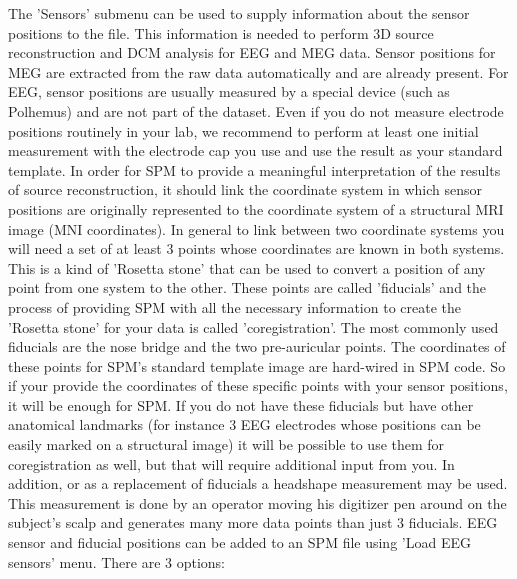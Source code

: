 The 'Sensors' submenu can be used to supply information about the
sensor positions to the file. This information is needed to perform 3D
source reconstruction and DCM analysis for EEG and MEG data. 
Sensor positions for MEG are extracted from the raw data automatically and are already present. For EEG,
sensor positions are usually measured by a special device (such as
Polhemus) and are not part of the dataset. Even if you do not
measure electrode positions routinely in your lab, we recommend to
perform at least one initial measurement with the electrode cap you
use and use the result as your standard template. In order for SPM to provide a meaningful
interpretation of the results of source reconstruction, it should link the coordinate
system in which sensor positions are originally represented to the coordinate system of
a structural MRI image (MNI coordinates). In general to link between two coordinate
systems you will need a set of at least 3 points whose coordinates are known in both systems.
This is a kind of 'Rosetta stone'  that can be used to convert a position of any point from one system
to the other. These points are called 'fiducials' and the process of providing SPM with all the necessary
information to create the 'Rosetta stone' for your data is called 'coregistration'. 
 The most commonly used fiducials are the nose bridge and the two pre-auricular points.
The coordinates of these points for SPM's standard template
image are hard-wired in SPM code. So if your provide the coordinates of these specific
points with your sensor positions, it will be enough for SPM. If you do not have these
fiducials but have other anatomical landmarks (for instance 3 EEG electrodes whose positions can
be easily marked on a structural image) it will be possible to use them for coregistration as well, but that will
require additional input from you. In addition, or as a replacement of fiducials a headshape measurement may be used.
This measurement is done by an operator moving his
digitizer pen around on the subject's scalp and generates many more data 
points than just 3 fiducials. EEG sensor and fiducial positions can be added to an 
SPM file using 'Load EEG sensors' menu. There are 3 options:

